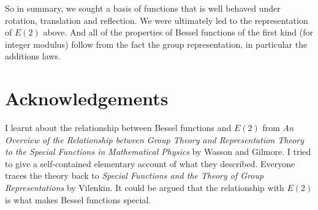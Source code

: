 \documentclass{article}
\begin{document}
So in summary, we sought a basis of functions that is well behaved under rotation, translation and reflection.
We were ultimately led to the representation of $E(2)$ above.
And all of the properties of Bessel functions of the first kind (for integer modulus) follow from the fact the group representation, in particular the additions laws.

\section{Acknowledgements}
I learnt about the relationship between Bessel functions and $E(2)$ from \textit{An Overview of the Relationship between Group Theory and Representation Theory to the Special Functions in Mathematical Physics} by Wasson and Gilmore.
I tried to give a self-contained elementary account of what they described.
Everyone traces the theory back to \textit{Special Functions and the Theory of Group Representations} by Vilenkin.
It could be argued that the relationship with $E(2)$ is what makes Bessel functions special.
\end{document}
